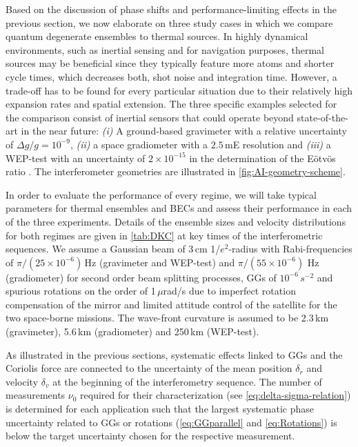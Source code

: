Based on the discussion of phase shifts and performance-limiting effects in the previous section, we now elaborate on three study cases in which we compare quantum degenerate ensembles to thermal sources.
In highly dynamical environments, such as inertial sensing and for navigation purposes, thermal sources may be beneficial since they typically feature more atoms and shorter cycle times, which decreases both, shot noise and integration time. However, a trade-off has to be found for every particular situation due to their relatively high expansion rates and spatial extension.
The three specific examples selected for the comparison consist of inertial sensors that could operate beyond state-of-the-art in the near future: \emph{(i)} A ground-based gravimeter with a relative uncertainty of $\Delta g/g=10^{-9}$, \emph{(ii)} a space gradiometer with a $2.5$\,mE resolution \cite{Trimeche2019} and \emph{(iii)} a WEP-test with an uncertainty of $2\times10^{-15}$ in the determination of the Eötvös ratio \cite{Aguilera2014}. The interferometer geometries are illustrated in \autoref{fig:AI-geometry-scheme}.

In order to evaluate the performance of every regime, we will take typical parameters for thermal ensembles and BECs and assess their performance in each of the three experiments. Details of the ensemble sizes and velocity distributions for both regimes are given in \autoref{tab:DKC} at key times of the interferometric sequences.
We assume a Gaussian beam of 3\,cm 1/$e^2$-radius with Rabi-frequencies of $\pi/(25\times 10^{-6})$\,Hz (gravimeter and WEP-test) and $\pi/(55\times 10^{-6})$ Hz (gradiometer) for second order beam splitting processes, GGs of $10^{-6}$\,$s^{-2}$ and spurious rotations on the order of 1\,$\mu$rad/s due to imperfect rotation compensation of the mirror and limited attitude control of the satellite for the two space-borne missions. The wave-front curvature is assumed to be 2.3\,km (gravimeter), 5.6\,km (gradiometer) and 250\,km (WEP-test). 

As illustrated in the previous sections, systematic effects linked to GGs and the Coriolis force are connected to the uncertainty of the mean position $\delta_r$ and velocity $\delta_v$ at the beginning of the interferometry sequence. The number of measurements $\nu_0$ required for their characterization (see \autoref{eq:delta-sigma-relation}) is determined for each application such that the largest systematic phase uncertainty related to GGs or rotations (\autoref{eq:GGparallel} and \autoref{eq:Rotations}) is below the target uncertainty chosen for the respective measurement.

